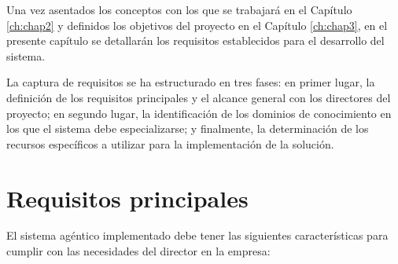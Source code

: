 Una vez asentados los conceptos con los que se trabajará en el Capítulo \ref{ch:chap2} y definidos los objetivos del proyecto en el Capítulo \ref{ch:chap3}, en el presente capítulo se detallarán los requisitos establecidos para el desarrollo del sistema.

La captura de requisitos se ha estructurado en tres fases: en primer lugar, la definición de los requisitos principales y el alcance general con los directores del proyecto; en segundo lugar, la identificación de los dominios de conocimiento en los que el sistema debe especializarse; y finalmente, la determinación de los recursos específicos a utilizar para la implementación de la solución.

\section{Requisitos principales}

El sistema agéntico implementado debe tener las siguientes características para cumplir con las necesidades del director en la empresa: 

